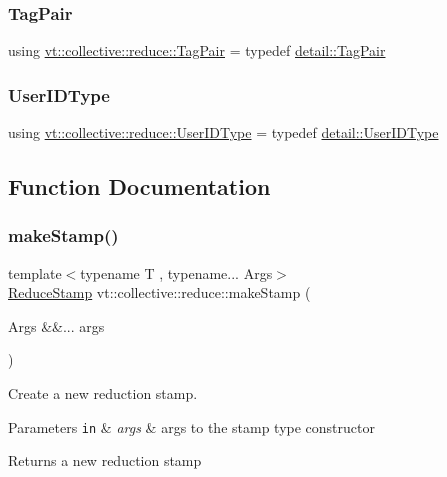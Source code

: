 \subsubsection{\texorpdfstring{Tag\+Pair}{TagPair}}
{\footnotesize\ttfamily using \hyperlink{namespacevt_1_1collective_1_1reduce_ae3111ccd7e2214f079222e4c016b6652}{vt\+::collective\+::reduce\+::\+Tag\+Pair} = typedef \hyperlink{structvt_1_1collective_1_1reduce_1_1detail_1_1_tag_pair}{detail\+::\+Tag\+Pair}}

\mbox{\label{namespacevt_1_1collective_1_1reduce_a6cdf1adaf7aedc9df00c92fe55cdcecd}} 
\subsubsection{\texorpdfstring{User\+I\+D\+Type}{UserIDType}}
{\footnotesize\ttfamily using \hyperlink{namespacevt_1_1collective_1_1reduce_a6cdf1adaf7aedc9df00c92fe55cdcecd}{vt\+::collective\+::reduce\+::\+User\+I\+D\+Type} = typedef \hyperlink{namespacevt_1_1collective_1_1reduce_1_1detail_ae82d7b96b0885b9b7dfb0104398beead}{detail\+::\+User\+I\+D\+Type}}



\subsection{Function Documentation}
\mbox{\label{namespacevt_1_1collective_1_1reduce_a16bd926f0a7f318a75d2bf921b516db3}} 
\subsubsection{\texorpdfstring{make\+Stamp()}{makeStamp()}}
{\footnotesize\ttfamily template$<$typename T , typename... Args$>$ \\
\hyperlink{namespacevt_1_1collective_1_1reduce_a7b7cb3021ac5654d92825d9fab0250b2}{Reduce\+Stamp} vt\+::collective\+::reduce\+::make\+Stamp (\begin{DoxyParamCaption}\item[{Args \&\&...}]{args }\end{DoxyParamCaption})}



Create a new reduction stamp. 


\begin{DoxyParams}[1]{Parameters}
\mbox{\tt in}  & {\em args} & args to the stamp type constructor\\
\hline
\end{DoxyParams}
\begin{DoxyReturn}{Returns}
a new reduction stamp 
\end{DoxyReturn}
